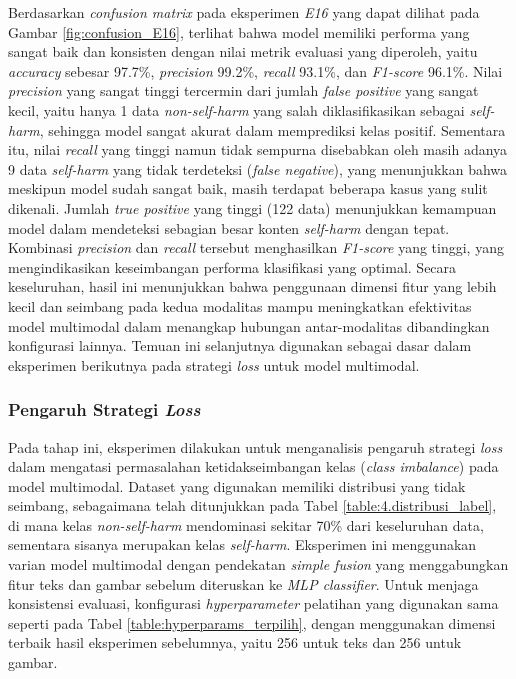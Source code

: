 Berdasarkan \textit{confusion matrix} pada eksperimen \textit{E16} yang dapat dilihat pada Gambar \ref{fig:confusion_E16}, terlihat bahwa model memiliki performa yang sangat baik dan konsisten dengan nilai metrik evaluasi yang diperoleh, yaitu \textit{accuracy} sebesar 97.7\%, \textit{precision} 99.2\%, \textit{recall} 93.1\%, dan \textit{F1-score} 96.1\%. Nilai \textit{precision} yang sangat tinggi tercermin dari jumlah \textit{false positive} yang sangat kecil, yaitu hanya 1 data \textit{non-self-harm} yang salah diklasifikasikan sebagai \textit{self-harm}, sehingga model sangat akurat dalam memprediksi kelas positif. Sementara itu, nilai \textit{recall} yang tinggi namun tidak sempurna disebabkan oleh masih adanya 9 data \textit{self-harm} yang tidak terdeteksi (\textit{false negative}), yang menunjukkan bahwa meskipun model sudah sangat baik, masih terdapat beberapa kasus yang sulit dikenali. Jumlah \textit{true positive} yang tinggi (122 data) menunjukkan kemampuan model dalam mendeteksi sebagian besar konten \textit{self-harm} dengan tepat. Kombinasi \textit{precision} dan \textit{recall} tersebut menghasilkan \textit{F1-score} yang tinggi, yang mengindikasikan keseimbangan performa klasifikasi yang optimal. Secara keseluruhan, hasil ini menunjukkan bahwa penggunaan dimensi fitur yang lebih kecil dan seimbang pada kedua modalitas mampu meningkatkan efektivitas model multimodal dalam menangkap hubungan antar-modalitas dibandingkan konfigurasi lainnya. Temuan ini selanjutnya digunakan sebagai dasar dalam eksperimen berikutnya pada strategi \textit{loss} untuk model multimodal.




\subsubsection{Pengaruh Strategi \textit{Loss}}
\label{IV.Multimodal Loss}
Pada tahap ini, eksperimen dilakukan untuk menganalisis pengaruh strategi \textit{loss} dalam mengatasi permasalahan ketidakseimbangan kelas (\textit{class imbalance}) pada model multimodal. Dataset yang digunakan memiliki distribusi yang tidak seimbang, sebagaimana telah ditunjukkan pada Tabel \ref{table:4.distribusi_label}, di mana kelas \textit{non-self-harm} mendominasi sekitar 70\% dari keseluruhan data, sementara sisanya merupakan kelas \textit{self-harm}. Eksperimen ini menggunakan varian model multimodal dengan pendekatan \textit{simple fusion} yang menggabungkan fitur teks dan gambar sebelum diteruskan ke \textit{MLP classifier}. Untuk menjaga konsistensi evaluasi, konfigurasi \textit{hyperparameter} pelatihan yang digunakan sama seperti pada Tabel \ref{table:hyperparams_terpilih}, dengan menggunakan dimensi terbaik hasil eksperimen sebelumnya, yaitu 256 untuk teks dan 256 untuk gambar.

